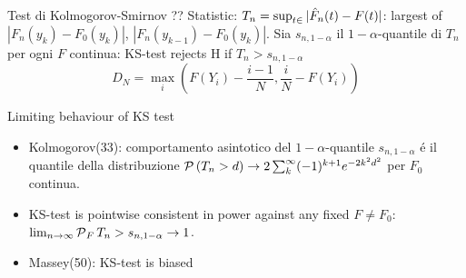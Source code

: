 \begin{frame}{Test di Kolmogorov-Smirnov ??}
Statistic: $T_n=\sup_{t\in\real}{|\hat{F}_n(t)-F(t)|}$: largest of $|F_n(y_k)-F_0(y_k)|$, $|F_n(y_{k-1})-F_0(y_k)|$. Sia $s_{n,1-\alpha}$ il $1-\alpha$-quantile di $T_n$ per ogni $F$ continua: KS-test rejects H if $T_n>s_{n,1-\alpha}$
\[D_N=\max_{i}(F(Y_i)-\frac{i-1}{N},\frac{i}{N}-F(Y_i))\]
\begin{block}{Limiting behaviour of KS test}
\begin{itemize}
\item Kolmogorov(33): comportamento asintotico del $1-\alpha$-quantile $s_{n,1-\alpha}$ \'e il quantile della distribuzione $\operatorname{\mathcal{P}}{(T_n>d)}\to2\sum_k^{\infty}(-1)^{k+1}e^{-2k^2d^2}$ per $F_0$ continua.
\item KS-test is pointwise consistent in power against any fixed $F\neq F_0$: $\lim_{n\to\infty}\operatorname{\mathcal{P}}_F{T_n>s_{n,1-\alpha}}\to1$.
\item Massey(50): KS-test is biased
\end{itemize}
\end{block}
\end{frame}